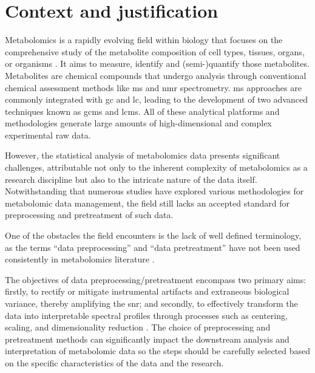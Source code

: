 \documentclass[ENG, BIB]{TFUOC}%
\begin{document}
\section{Context and justification}

Metabolomics is a rapidly evolving field within biology that focuses on the comprehensive study of the metabolite composition of cell types, tissues, organs, or organisms \cite{pattiMetabolomicsApogeeOmics2012,zhangSerumMetabolomicsNovel2012,chenGuideMetabolomicsAnalysis2022a}. It aims to measure, identify and (semi-)quantify those metabolites. Metabolites are chemical compounds that undergo analysis through conventional chemical assessment methods like \acrfull{ms} and \acrfull{nmr} spectrometry. \acrshort{ms} approaches are commonly integrated with \acrfull{gc} and \acrfull{lc}, leading to the development of two advanced techniques known as \acrfull{gcms} and \acrfull{lcms}. All of these analytical platforms and methodologies generate large amounts of high-dimensional and complex experimental raw data.

However, the statistical analysis of metabolomics data presents significant challenges, attributable not only to the inherent complexity of metabolomics as a research discipline but also to the intricate nature of the data itself. Notwithstanding that numerous studies have explored various methodologies for metabolomic data management, the field still lacks an accepted standard for preprocessing and pretreatment of such data.

One of the obstacles the field encounters is the lack of well defined terminology, as the terms “data preprocessing” and “data pretreatment” have not been used consistently in metabolomics literature \cite{sunPretreatingNormalizingMetabolomics2024}.

The objectives of data preprocessing/pretreatment encompass two primary aims: firstly, to rectify or mitigate instrumental artifacts and extraneous biological variance, thereby amplifying the \acrfull{snr}; and secondly, to effectively transform the data into interpretable spectral profiles through processes such as centering, scaling, and dimensionality reduction \cite{sunPretreatingNormalizingMetabolomics2024,martinPepsNMR1HNMR2018}. The choice of preprocessing and pretreatment methods can significantly impact the downstream analysis and interpretation of metabolomic data \cite{karamanPreprocessingPretreatmentMetabolomics2017} so the steps should be carefully selected based on the specific characteristics of the data and the research.
\end{document}
